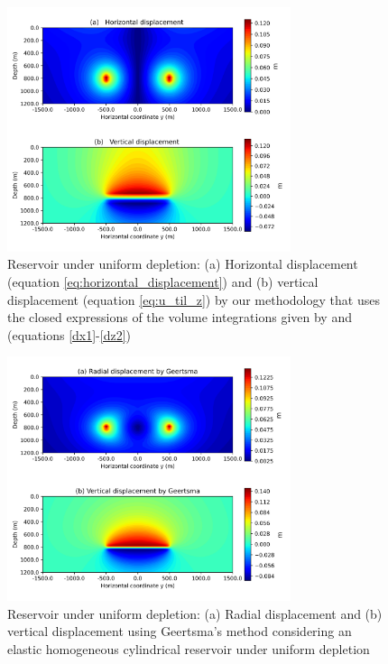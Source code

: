 \documentclass[journal abbreviation, manuscript]{copernicus}
\begin{document}
\begin{figure}[ht]
\includegraphics[width=8.3cm]{Fig/Figure_Displacement.png}
\caption{Reservoir under uniform depletion: (a) Horizontal displacement (equation \ref{eq:horizontal_displacement}) and (b) vertical displacement (equation \ref{eq:u_til_z}) by our methodology that uses the closed expressions of the volume integrations given by \cite{Nagyetal2000} and \cite{Nagyetal2002} (equations \ref{dx1}-\ref{dz2})}
\label{fig:displacement}
\end{figure}

\begin{figure}[h]
\includegraphics[width=8.3cm]{Fig/Figure_Displacement_Geertsma.png}
\caption{Reservoir under uniform depletion: (a) Radial displacement and (b) vertical displacement using Geertsma’s method \citep{Geertsma73}  considering an elastic homogeneous cylindrical reservoir under uniform depletion \citep{Fjaer08}}
\label{fig:displacement_Geertsma}
\end{figure}
\end{document}
